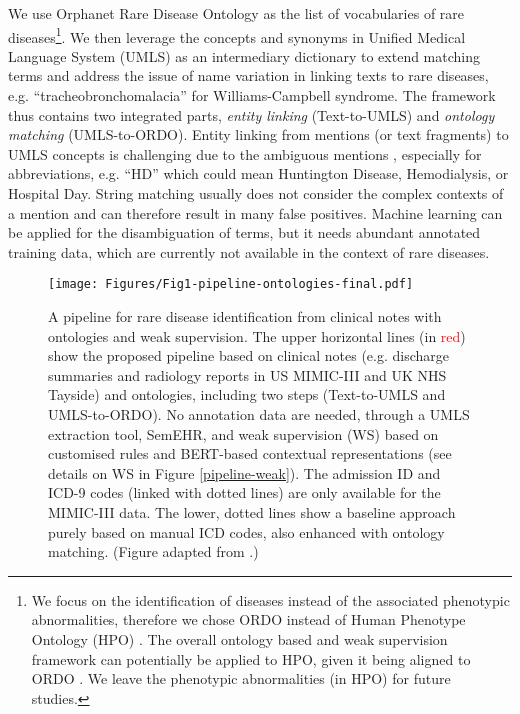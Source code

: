 \documentclass[twocolumn]{bmcart}
\begin{document}
We use Orphanet Rare Disease Ontology \cite{vasant2014ordo} as the list of vocabularies of rare diseases\footnote{We focus on the identification of diseases instead of the associated phenotypic abnormalities, therefore we chose ORDO instead of Human Phenotype Ontology (HPO) \cite{GROZA2015hpo}. The overall ontology based and weak supervision framework can potentially be applied to HPO, given it being aligned to ORDO \cite{MAIELLA2018}. We leave the phenotypic abnormalities (in HPO) for future studies.}. We then leverage the concepts and synonyms in Unified Medical Language System (UMLS) as an intermediary dictionary to extend matching terms and address the issue of name variation \cite{shen2015} in linking texts to rare diseases, e.g. ``tracheobronchomalacia'' for Williams-Campbell syndrome. The framework thus contains two integrated parts, \textit{entity linking} (Text-to-UMLS) and \textit{ontology matching} (UMLS-to-ORDO). Entity linking from mentions (or text fragments) to UMLS concepts is challenging due to the ambiguous mentions \cite{shen2015,kahn2017ontology}, especially for abbreviations, e.g. ``HD'' which could mean Huntington Disease, Hemodialysis, or Hospital Day. String matching usually does not consider the complex contexts of a mention and can therefore result in many false positives. Machine learning can be applied for the disambiguation of terms, but it needs abundant annotated training data, which are currently not available in the context of rare diseases.

\begin{figure*}
  \centering
  \texttt{[image: Figures/Fig1-pipeline-ontologies-final.pdf]}
  \caption{A pipeline for rare disease identification from clinical notes with ontologies and weak supervision. The upper horizontal lines (in \textcolor{red}{red}) show the proposed pipeline based on clinical notes (e.g. discharge summaries and radiology reports in US MIMIC-III and UK NHS Tayside) and ontologies, including two steps (Text-to-UMLS and UMLS-to-ORDO). No annotation data are needed, through a UMLS extraction tool, SemEHR, and weak supervision (WS) based on customised rules and BERT-based contextual representations (see details on WS in Figure \ref{pipeline-weak}). The admission ID and ICD-9 codes (linked with dotted lines) are only available for the MIMIC-III data. The lower, dotted lines show a baseline approach purely based on manual ICD codes, also enhanced with ontology matching. (Figure adapted from \cite{dong2021rare}.)}\label{pipeline-main}
\end{figure*}
\end{document}
